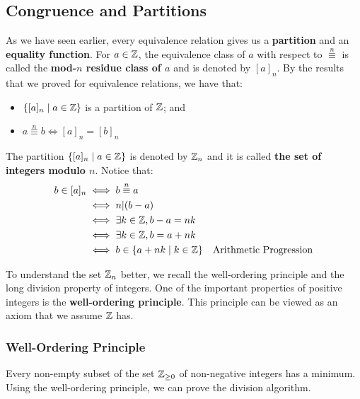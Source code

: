 \documentclass[letterpaper]{article}
\begin{document}
\subsection{Congruence and Partitions}
As we have seen earlier, every equivalence relation gives us a \textbf{partition} and an \textbf{equality function}. For $a \in \mathbb{Z}$, the equivalence class of $a$ with respect to $\overset{n}{\equiv}$ is called the \textbf{mod-$n$ residue class of $a$} and is denoted by $[a]_n$. By the results that we proved for equivalence relations, we have that:
\begin{itemize}
    \item $\{[a]_n \mid a \in \mathbb{Z}\}$ is a partition of $\mathbb{Z}$; and 
    \item $a \overset{n}{\equiv} b \iff [a]_n = [b]_n$ 
\end{itemize}

The partition $\{[a]_n \mid a \in \mathbb{Z}\}$ is denoted by $\mathbb{Z}_n$ and it is called \textbf{the set of integers modulo $n$}. Notice that:
\begin{equation*}
    \begin{aligned}
        b \in [a]_n &\iff b \overset{n}{\equiv} a \\ 
            &\iff n | (b - a) \\ 
            &\iff \exists k \in \mathbb{Z}, b - a = nk \\ 
            &\iff \exists k \in \mathbb{Z}, b = a + nk \\ 
            &\iff b \in \{a + nk \mid k \in \mathbb{Z}\} & \text{Arithmetic Progression}
    \end{aligned}
\end{equation*} 

To understand the set $\mathbb{Z}_n$ better, we recall the well-ordering principle and the long division property of integers. One of the important properties of positive integers is the \textbf{well-ordering principle}. This principle can be viewed as an axiom that we assume $\mathbb{Z}$ has. 

\subsubsection{Well-Ordering Principle}
Every non-empty subset of the set $\mathbb{Z}_{\geq 0}$ of non-negative integers has a minimum. Using the well-ordering principle, we can prove the division algorithm. 
\end{document}
